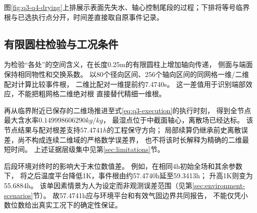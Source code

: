 图\ref{fig:q3-q4-drying}上排展示表面先失水、轴心控制尾段的过程；下排将等号临界根与已选执行点分开，时间差直接取自原事件记录。

\subsection{有限圆柱检验与工况条件}

为检验“各处”的空间含义，在长度0.25\unit{m}的有限圆柱上增加轴向传递，
侧面与端面保持相同物性和交换系数。
以80个径向区间、256个轴向区间的同网格一维/二维配对计算比较事件根，
二维比配对一维提前约7.4740\unit{s}。
这一差值用于识别端部效应，不能把粗网格二维绝对根
直接替代精细一维根。

再从临界附近已保存的二维场推进至式\eqref{eq:q3-execution}的执行时刻，
得到全节点最大含水率$0.149998606290\unit{kg/kg}$，
最湿点位于中截面轴心，离散场已经达标。
该节点结果与配对根差支持$57.4741\unit{h}$的工程保守方向；
局部续算仍继承前史离散误差，尚不构成连续二维域的严格数学误差界，
也不将该时长解释为精确的二维最短时间。
上述证据层级集中见第\ref{sec:limitations}节。

后段环境对终时的影响大于末位数值差。
例如，在相同4\unit{h}初始全场和其余参数下，
将之后温度平台降低1\unit{K}，事件根由约57.4740\unit{h}延至59.3413\unit{h}；
升高1\unit{K}则变为55.6884\unit{h}。
该单因素情景为人为设定而非观测误差范围（见第\ref{sec:environment-scenarios}节）。
故57.4741\unit{h}应与环境平台和有效气固边界共同报告，
不能仅凭小数位数给出真实工况下的确定性保证。

\endgroup
